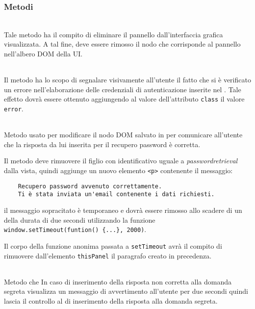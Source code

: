 \subsubsection*{Metodi}
\begin{description}
  \item{}\\
  Tale metodo ha il compito di eliminare il pannello dall'interfaccia grafica visualizzata. A tal fine, deve essere rimosso il nodo che corrisponde al pannello nell'albero DOM della UI\@.
  
  \item{}\\
  Il metodo ha lo scopo di segnalare visivamente all'utente il fatto che si è verificato un errore nell'elaborazione delle credenziali di autenticazione inserite nel . Tale effetto dovrà essere ottenuto aggiungendo al valore dell'attributo \verb+class+ il valore \verb+error+.
  
  \item{}\\
	Metodo usato per modificare il nodo DOM salvato in  per comunicare all'utente che la risposta da lui inserita per il recupero password è corretta. 
	
Il metodo deve rimuovere il figlio con identificativo uguale a \textit{passwordretrieval} dalla vista, quindi aggiunge un nuovo elemento \verb'<p>' contenente il messaggio:
\begin{verbatim}
	Recupero password avvenuto correttamente.
	Ti è stata inviata un'email contenente i dati richiesti.
\end{verbatim}
il messaggio sopracitato è temporaneo e dovrà essere rimosso allo scadere di un  della durata di due secondi utilizzando la funzione \verb'window.setTimeout(funtion() {...}, 2000)'.

Il corpo della funzione anonima passata a \verb'setTimeout' avrà il compito di rimuovere dall'elemento \verb'thisPanel' il paragrafo creato in precedenza.

	\item{}\\
	Metodo che In caso di inserimento della risposta non corretta alla domanda segreta visualizza un messaggio di avvertimento all'utente per due secondi quindi lascia il controllo al  di inserimento della risposta alla domanda segreta.
	

\end{description}
